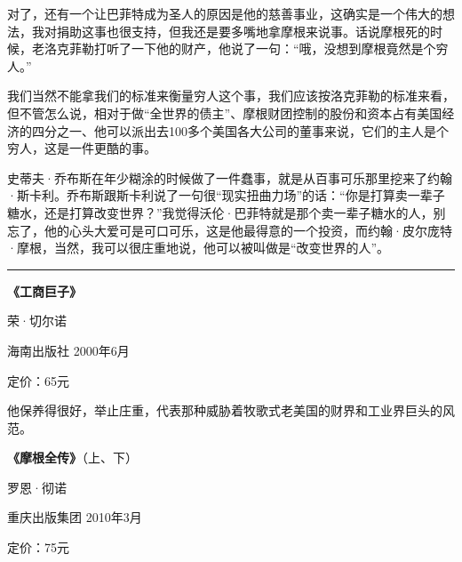 对了，还有一个让巴菲特成为圣人的原因是他的慈善事业，这确实是一个伟大的想法，我对捐助这事也很支持，但我还是要多嘴地拿摩根来说事。话说摩根死的时候，老洛克菲勒打听了一下他的财产，他说了一句：``哦，没想到摩根竟然是个穷人。''

我们当然不能拿我们的标准来衡量穷人这个事，我们应该按洛克菲勒的标准来看，但不管怎么说，相对于做``全世界的债主''、摩根财团控制的股份和资本占有美国经济的四分之一、他可以派出去100多个美国各大公司的董事来说，它们的主人是个穷人，这是一件更酷的事。

史蒂夫·乔布斯在年少糊涂的时候做了一件蠢事，就是从百事可乐那里挖来了约翰·斯卡利。乔布斯跟斯卡利说了一句很``现实扭曲力场''的话：``你是打算卖一辈子糖水，还是打算改变世界？''我觉得沃伦·巴菲特就是那个卖一辈子糖水的人，别忘了，他的心头大爱可是可口可乐，这是他最得意的一个投资，而约翰·皮尔庞特·摩根，当然，我可以很庄重地说，他可以被叫做是``改变世界的人''。

\begin{center}\rule{3in}{0.4pt}\end{center}

\textbf{《工商巨子》}

荣·切尔诺

海南出版社 2000年6月

定价：65元

他保养得很好，举止庄重，代表那种威胁着牧歌式老美国的财界和工业界巨头的风范。

\textbf{《摩根全传》}（上、下）

罗恩·彻诺

重庆出版集团 2010年3月

定价：75元
